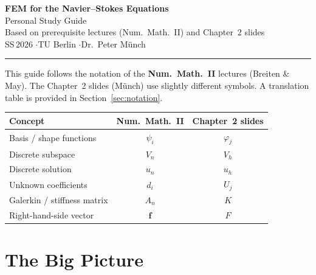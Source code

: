 \documentclass[11pt,a4paper]{article}
\theoremstyle{plain}
\theoremstyle{remark}
\begin{document}
\begin{center}
  {\LARGE\bfseries FEM for the Navier--Stokes Equations}\\[4pt]
  {\Large Personal Study Guide}\\[10pt]
  {\large Based on prerequisite lectures (Num.\ Math.\ II)
          and Chapter~2 slides}\\[6pt]
  {\normalsize SS\,2026 \quad$\cdot$\quad TU Berlin
               \quad$\cdot$\quad Dr.\ Peter M\"unch}\\[12pt]
  \rule{0.6\textwidth}{0.4pt}
\end{center}

\vspace{0.3cm}

\begin{notationbox}
This guide follows the notation of the \textbf{Num.\ Math.\ II} lectures
(Breiten \& May).  The Chapter~2 slides (M\"unch) use slightly different
symbols.  A translation table is provided in Section~\ref{sec:notation}.

\medskip
\renewcommand{\arraystretch}{1.2}
\begin{center}
\begin{tabular}{@{}lcc@{}}
  \toprule
  \textbf{Concept} & \textbf{Num.\ Math.\ II} & \textbf{Chapter~2 slides}\\
  \midrule
  Basis / shape functions & $\psi_i$       & $\varphi_j$     \\
  Discrete subspace       & $V_n$          & $V_h$            \\
  Discrete solution       & $u_n$          & $u_h$            \\
  Unknown coefficients    & $d_i$          & $U_j$            \\
  Galerkin / stiffness matrix & $A_n$      & $K$              \\
  Right-hand-side vector  & $\mathbf{f}$   & $F$              \\
  \bottomrule
\end{tabular}
\end{center}
\end{notationbox}

\vspace{0.2cm}
\tableofcontents
\newpage

\section{The Big Picture}
\label{sec:bigpicture}
\end{document}
